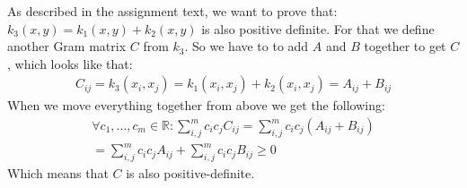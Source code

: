 As described in the assignment text, we want to prove that: $k_3(x,y) = k_1(x,y) + k_2(x,y)$ is also positive definite.
For that we define another Gram matrix $C$ from $k_3$.
So we have to to add $A$ and $B$ together to get $C$, which looks like that:
\begin{align}
C_{ij} = k_3(x_i,x_j) = k_1(x_i,x_j) + k_2(x_i,x_j) = A_{ij} + B_{ij}
\end{align} 
When we move everything together from above we get the following:
\begin{align}
\forall c_1,...,c_m \in \mathbb{R}: \sum_{i,j}^m c_i c_j C_{ij} = \sum_{i,j}^m c_i c_j (A_{ij} + B_{ij}) \\
= \sum_{i,j}^m c_i c_jA_{ij} + \sum_{i,j}^m c_i c_jB_{ij} \geq 0
\end{align}
Which means that $C$ is also positive-definite.

